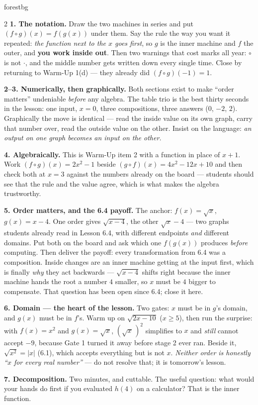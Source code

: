 \documentclass[10pt]{article}
\begin{document}
\begin{skillbox}[Lesson]{forestbg}
\begin{multicols}{2}
\textbf{1. The notation.} Draw the two machines in series and put $(f\circ g)(x)=f(g(x))$ under
them. Say the rule the way you want it repeated: \emph{the function next to the $x$ goes first}, so
$g$ is the inner machine and $f$ the outer, and \textbf{you work inside out}. Then two warnings that
cost marks all year: $\circ$ is not $\cdot$, and the middle number gets written down every single
time. Close by returning to Warm-Up 1(d) --- they already did $(f\circ g)(-1)=1$.

\textbf{2--3. Numerically, then graphically.} Both sections exist to make ``order matters''
undeniable \emph{before} any algebra. The table trio is the best thirty seconds in the lesson: one
input, $x=0$, three compositions, three answers ($0$, $-2$, $2$). Graphically the move is identical
--- read the inside value on its own graph, carry that number over, read the outside value on the
other. Insist on the language: \emph{an output on one graph becomes an input on the other.}

\textbf{4. Algebraically.} This is Warm-Up item 2 with a function in place of $x+1$. Work
$(f\circ g)(x)=2x^{2}-1$ beside $(g\circ f)(x)=4x^{2}-12x+10$ and then check both at $x=3$ against
the numbers already on the board --- students should see that the rule and the value agree, which is
what makes the algebra trustworthy.

\columnbreak

\textbf{5. Order matters, and the 6.4 payoff.} The anchor: $f(x)=\sqrt{x}$, $g(x)=x-4$. One order
gives $\sqrt{x-4}$, the other $\sqrt{x}-4$ --- two graphs students already read in Lesson 6.4, with
different endpoints \emph{and} different domains. Put both on the board and ask which one
$f(g(x))$ produces \emph{before} computing. Then deliver the payoff: every transformation from 6.4
was a composition. Inside changes are an inner machine getting at the input first, which is finally
\emph{why} they act backwards --- $\sqrt{x-4}$ shifts right because the inner machine hands the root
a number $4$ smaller, so $x$ must be $4$ bigger to compensate. That question has been open since
6.4; close it here.

\textbf{6. Domain --- the heart of the lesson.} Two gates: $x$ must be in $g$'s domain, and $g(x)$
must be in $f$'s. Warm up on $\sqrt{2x-10}$ ($x\ge5$), then run the surprise: with $f(x)=x^{2}$ and
$g(x)=\sqrt{x}$, $\left(\sqrt{x}\,\right)^{2}$ simplifies to $x$ and \emph{still} cannot accept
$-9$, because Gate 1 turned it away before stage 2 ever ran. Beside it, $\sqrt{x^{2}}=|x|$ (6.1),
which accepts everything but is not $x$. \emph{Neither order is honestly ``$x$ for every real
number''} --- do not resolve that; it is tomorrow's lesson.

\textbf{7. Decomposition.} Two minutes, and cuttable. The useful question: what would your hands do
first if you evaluated $h(4)$ on a calculator? That is the inner function.
\end{multicols}
\end{skillbox}
\end{document}
